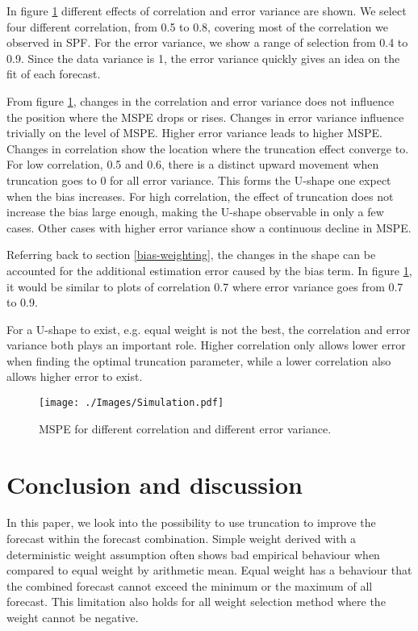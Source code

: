 \documentclass[11pt]{article}
\begin{document}
In figure \ref{fig: simulation} different effects of correlation and error variance are shown. We select four different correlation, from 0.5 to 0.8, covering most of the correlation we observed in SPF. For the error variance, we show a range of selection from 0.4 to 0.9. Since the data variance is 1, the error variance quickly gives an idea on the fit of each forecast. 

From figure \ref{fig: simulation}, changes in the correlation and error variance does not influence the position where the MSPE drops or rises. Changes in error variance influence trivially on the level of MSPE. Higher error variance leads to higher MSPE. Changes in correlation show the location where the truncation effect converge to. For low correlation, 0.5 and 0.6, there is a distinct upward movement when truncation goes to 0 for all error variance. This forms the U-shape one expect when the bias increases. For high correlation, the effect of truncation does not increase the bias large enough, making the U-shape observable in only a few cases. Other cases with higher error variance show a continuous decline in MSPE. 

Referring back to section \ref{bias-weighting}, the changes in the shape can be accounted for the additional estimation error caused by the bias term. In figure \ref{fig: simulation}, it would be similar to plots of correlation 0.7 where error variance goes from 0.7 to 0.9.

For a U-shape to exist, e.g. equal weight is not the best, the correlation and error variance both plays an important role. Higher correlation only allows lower error when finding the optimal truncation parameter, while a lower correlation also allows higher error to exist.

\begin{figure}[!h]
	\centering
	\texttt{[image: ./Images/Simulation.pdf]}
	\caption{MSPE for different correlation and different error variance.}\label{fig: simulation}
\end{figure}

\section{Conclusion and discussion}\label{conclusion}
In this paper, we look into the possibility to use truncation to improve the forecast within the forecast combination. Simple weight derived with a deterministic weight assumption often shows bad empirical behaviour when compared to equal weight by arithmetic mean. Equal weight has a behaviour that the combined forecast cannot exceed the minimum or the maximum of all forecast. This limitation also holds for all weight selection method where the weight cannot be negative. 
\end{document}
